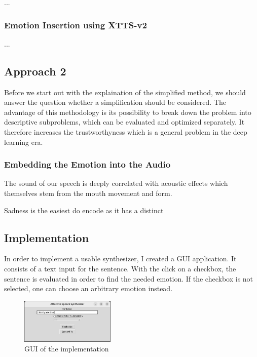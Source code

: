 \documentclass[11pt]{article}
\begin{document}
...
\subsubsection{Emotion Insertion using XTTS-v2}
...

\subsection{Approach 2}

Before we start out with the explaination of the simplified method, we should answer the question whether a simplification should be considered. The advantage of this methodology is its possibility to break down the problem into descriptive subproblems, which can be evaluated and optimized separately. It therefore increases the trustworthyness which is a general problem in the deep learning era.


\subsubsection{Embedding the Emotion into the Audio}

The sound of our speech is deeply correlated with acoustic effects which themselves stem from the mouth movement and form\cite{arias_beyond_2020}. 



Sadness is the easiest do encode as it has a distinct


\subsection{Implementation}

In order to implement a usable synthesizer, I created a GUI application. It consists of a text input for the sentence. With the click on a checkbox, the sentence is evaluated in order to find the needed emotion. If the checkbox is not selected, one can choose an arbitrary emotion instead. 

\begin{figure}[h]
 \centering
\includegraphics[width=0.4\textwidth]{"Bilder/GUI.png"}
\caption{GUI of the implementation}
\end{figure}
\end{document}
